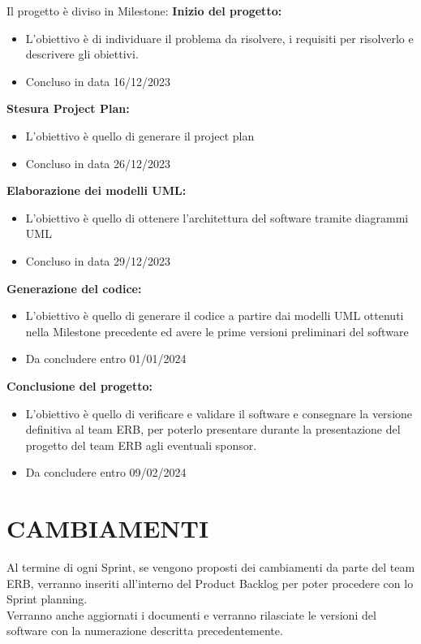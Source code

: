 \documentclass{report}
\begin{document}
Il progetto è diviso in Milestone:
\textbf{Inizio del progetto:} 
\begin{itemize}
\item L'obiettivo è di individuare il problema da risolvere, i requisiti per risolverlo e descrivere gli obiettivi.
\item Concluso in data 16/12/2023
\end{itemize}

\textbf{Stesura Project Plan:}
\begin{itemize}
\item L'obiettivo è quello di generare il project plan
\item Concluso in data 26/12/2023
\end{itemize}

\textbf{Elaborazione dei modelli UML:}
\begin{itemize}
\item L'obiettivo è quello di ottenere l'architettura del software tramite diagrammi UML
\item Concluso in data 29/12/2023
\end{itemize}

\textbf{Generazione del codice:}
\begin{itemize}
\item L'obiettivo è quello di generare il codice a partire dai modelli UML ottenuti nella Milestone precedente ed avere le prime versioni preliminari del software
\item Da concludere entro 01/01/2024
\end{itemize}

\textbf{Conclusione del progetto:}
\begin{itemize}
\item L'obiettivo è quello di verificare e validare il software e consegnare la versione definitiva al team ERB, per poterlo presentare durante la presentazione del progetto del team ERB agli eventuali sponsor.
\item Da concludere entro 09/02/2024
\end{itemize}

\chapter{CAMBIAMENTI}
Al termine di ogni Sprint, se vengono proposti dei cambiamenti da parte del team ERB, verranno inseriti all'interno del Product Backlog per poter procedere con lo Sprint planning.\\
Verranno anche aggiornati i documenti e verranno rilasciate le versioni del software con la numerazione descritta precedentemente.
\end{document}
